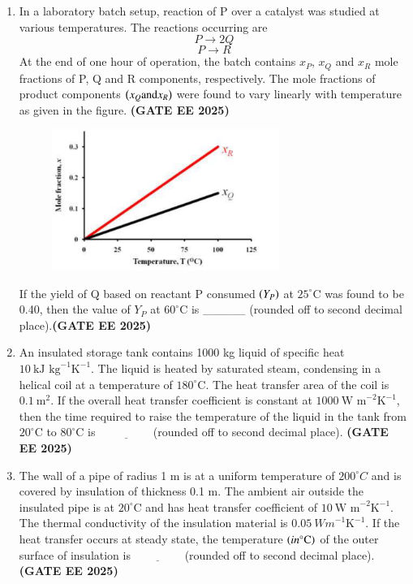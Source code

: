 \documentclass[journal,12pt,onecolumn]{IEEEtran}
\theoremstyle{remark}
\begin{document}
\begin{enumerate}
\item In a laboratory batch setup, reaction of P over a catalyst was studied at various temperatures. The reactions occurring are
\[ P\rightarrow2Q \]
\[ P\rightarrow R \]
At the end of one hour of operation, the batch contains $x_{P}$, $x_{Q}$ and $x_{R}$ mole fractions of P, Q and R components, respectively. The mole fractions of product components $\left(x_{Q} \text{and} x_{R}\right)$ were found to vary linearly with temperature as given in the figure. \hfill \textbf{(GATE EE 2025)}

\begin{figure}
	\begin{center}
  
 \includegraphics[width=0.7\textwidth]{figs/33.png}
	\caption{}
	\label{fig33}
\end{center}
\end{figure}
If the yield of Q based on reactant P consumed $\left(Y_{P}\right)$ at $25^{\circ}\text{C}$ was found to be 0.40, then the value of $Y_{P}$ at $60^{\circ}\text{C}$ is \_\_\_\_\_ (rounded off to second decimal place).\hfill \textbf{(GATE EE 2025)}

\item An insulated storage tank contains 1000 kg liquid of specific heat $10~\text{kJ kg}^{-1}\text{K}^{-1}$. The liquid is heated by saturated steam, condensing in a helical coil at a temperature of $180^{\circ}\text{C}$. The heat transfer area of the coil is $0.1~\text{m}^{2}$. If the overall heat transfer coefficient is constant at $1000~\text{W m}^{-2}\text{K}^{-1}$, then the time  required to raise the temperature of the liquid in the tank from $20^{\circ}\text{C}$ to $80^{\circ}\text{C}$ is $\underline{\hspace{2cm}}$(rounded off to second decimal place). \hfill \textbf{(GATE EE 2025)}



\item The wall of a pipe of radius 1 m is at a uniform temperature of $200^{\circ}C$ and is covered by insulation of thickness 0.1 m. The ambient air outside the insulated pipe is at $20^{\circ}\text{C}$ and has heat transfer coefficient of $10~\text{W m}^{-2}\text{K}^{-1}$. The thermal conductivity of the insulation material is $0.05~{W m}^{-1}\text{K}^{-1}$. If the heat transfer occurs at steady state, the temperature $\left(in {}^{\circ}\text{C}\right)$ of the outer surface of insulation is$\underline{\hspace{2cm}}$(rounded off to second decimal place).\hfill \textbf{(GATE EE 2025)}




\end{enumerate}
\end{document}
